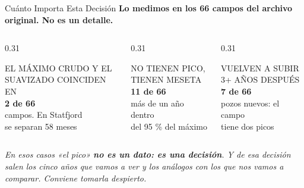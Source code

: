 \documentclass[aspectratio=169, 11pt]{beamer}
\begin{document}
\begin{frame}[shrink=8]{Cuánto Importa Esta Decisión}
  \vspace{-4pt}
  {\small\color{arcaDark}\bfseries
   Lo medimos en los 66 campos del archivo original. No es un detalle.}
  \vspace{9pt}
  \begin{columns}[T]
    \begin{column}{0.31\textwidth}
      \begin{tcolorbox}[colback=arcaGray, colframe=arcaRed, boxrule=0pt, leftrule=3pt,
        arc=3pt, left=6pt, right=6pt, top=6pt, bottom=6pt]
        \centering
        {\scriptsize\color{textMuted}EL MÁXIMO CRUDO Y EL\\SUAVIZADO COINCIDEN EN}\\[4pt]
        {\LARGE\color{arcaRed}\bfseries 2 de 66}\\[4pt]
        {\scriptsize\color{textMuted}campos. En Statfjord\\se separan 58 meses}
      \end{tcolorbox}
    \end{column}
    \begin{column}{0.31\textwidth}
      \begin{tcolorbox}[colback=arcaGray, colframe=codeOrange, boxrule=0pt, leftrule=3pt,
        arc=3pt, left=6pt, right=6pt, top=6pt, bottom=6pt]
        \centering
        {\scriptsize\color{textMuted}NO TIENEN PICO,\\TIENEN MESETA}\\[4pt]
        {\LARGE\color{codeOrange}\bfseries 11 de 66}\\[4pt]
        {\scriptsize\color{textMuted}más de un año dentro\\del 95 \% del máximo}
      \end{tcolorbox}
    \end{column}
    \begin{column}{0.31\textwidth}
      \begin{tcolorbox}[colback=arcaGray, colframe=arcaDark, boxrule=0pt, leftrule=3pt,
        arc=3pt, left=6pt, right=6pt, top=6pt, bottom=6pt]
        \centering
        {\scriptsize\color{textMuted}VUELVEN A SUBIR\\3+ AÑOS DESPUÉS}\\[4pt]
        {\LARGE\color{arcaDark}\bfseries 7 de 66}\\[4pt]
        {\scriptsize\color{textMuted}pozos nuevos: el campo\\tiene dos picos}
      \end{tcolorbox}
    \end{column}
  \end{columns}
  \vspace{9pt}
  {\footnotesize\color{arcaDark}\itshape
   En esos casos «el pico» \textbf{no es un dato: es una decisión}. Y de esa
   decisión salen los cinco años que vamos a ver y los análogos con los que
   nos vamos a comparar. Conviene tomarla despierto.}
\end{frame}
\end{document}
